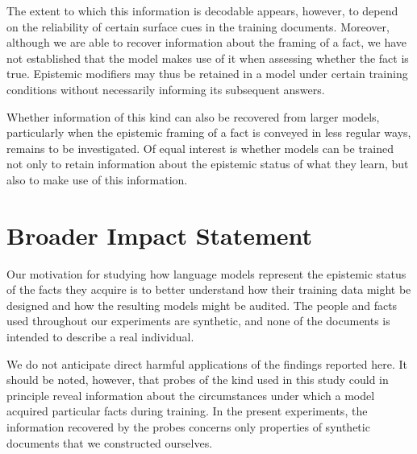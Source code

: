 The extent to which this information is decodable appears, however, to depend on the reliability of certain surface cues in the training documents. Moreover, although we are able to recover information about the framing of a fact, we have not established that the model makes use of it when assessing whether the fact is true. Epistemic modifiers may thus be retained in a model under certain training conditions without necessarily informing its subsequent answers.

Whether information of this kind can also be recovered from larger models, particularly when the epistemic framing of a fact is conveyed in less regular ways, remains to be investigated. Of equal interest is whether models can be trained not only to retain information about the epistemic status of what they learn, but also to make use of this information.


\section*{Broader Impact Statement}

Our motivation for studying how language models represent the epistemic status of the facts they acquire is to better understand how their training data might be designed and how the resulting models might be audited. The people and facts used throughout our experiments are synthetic, and none of the documents is intended to describe a real individual.

We do not anticipate direct harmful applications of the findings reported here. It should be noted, however, that probes of the kind used in this study could in principle reveal information about the circumstances under which a model acquired particular facts during training. In the present experiments, the information recovered by the probes concerns only properties of synthetic documents that we constructed ourselves.
